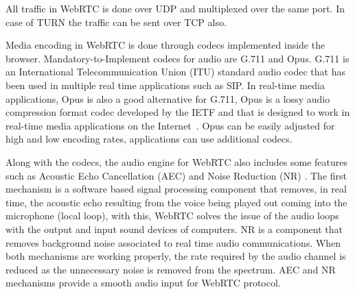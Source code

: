All traffic in WebRTC is done over UDP and multiplexed over the same port. In case of TURN the traffic can be sent over TCP also.

Media encoding in WebRTC is done through codecs implemented inside the browser. Mandatory-to-Implement codecs for audio are G.711 and Opus. G.711 is an International Telecommunication Union (ITU)  standard audio codec that has been used in multiple real time applications such as SIP. In real-time media applications, Opus is also a good alternative for G.711, Opus is a lossy audio compression format codec developed by the IETF and that is designed to work in real-time media applications on the Internet~\cite{opusIETF}. Opus can be easily adjusted for high and low encoding rates, applications can use additional codecs.

Along with the codecs, the audio engine for WebRTC also includes some features such as Acoustic Echo Cancellation (AEC)  and Noise Reduction (NR) . The first mechanism is a software based signal processing component that removes, in real time, the acoustic echo resulting from the voice being played out coming into the microphone (local loop), with this, WebRTC solves the issue of the audio loops with the output and input sound devices of computers. NR is a component that removes background noise associated to real time audio communications. When both mechanisms are working properly, the rate required by the audio channel is reduced as the unnecessary noise is removed from the spectrum. AEC and NR mechanisms provide a smooth audio input for WebRTC protocol.


